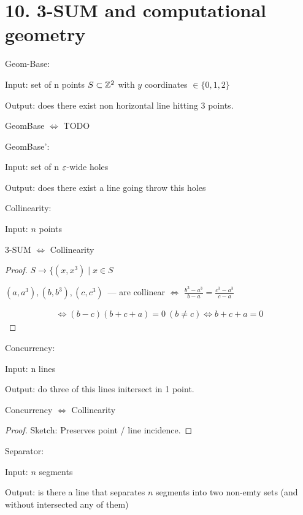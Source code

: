 \section{10. 3-SUM and computational geometry}

\begin{lm}

	Geom-Base:

	Input: set of n points $S \subset \mathbb{Z}^2$ with $y$ coordinates $\in \{0,1,2\}$ 

	Output: does there exist non horizontal line hitting 3 points.

\end{lm}

\begin{lm}
	GeomBase $\Leftrightarrow$ {\color{red} TODO}
\end{lm}


GeomBase':

Input: set of n $\varepsilon$-wide holes 

Output: does there exist a line going throw this holes 


Collinearity:

Input: $n$ points 


\begin{lm}
	3-SUM $\Leftrightarrow$ Collinearity
\end{lm}

\begin{proof}
	$S \to \{(x, x^3) \mid x \in S$

		$(a, a^3), (b, b^3), (c, c^3)$~--- are collinear $\Leftrightarrow$ $\frac{b^3 - a^3}{b - a} = \frac{c^3 - a^3}{c - a}$

		\begin{align*}
			\Leftrightarrow (b - c) (b + c + a) = 0 \ (b \ne c) \Leftrightarrow b + c + a = 0
		\end{align*}
\end{proof}

Concurrency:

Input: n lines 

Output: do three of this lines initersect in 1 point.

\begin{lm}
	Concurrency $\Leftrightarrow$ Collinearity
\end{lm}

\begin{proof}
	Sketch:
	Preserves point / line incidence.
\end{proof}

\begin{df}
Separator:

Input: $n$ segments

Output: is there a line that separates $n $ segments into two non-emty sets (and without intersected any of them)

\end{df}

